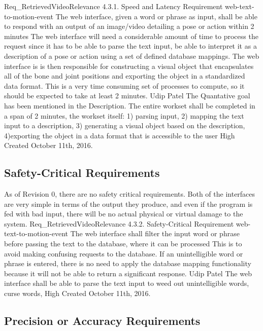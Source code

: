 \documentclass{scrreprt}
\begin{document}
\requirement
{Req_RetrievedVideoRelevance}
{4.3.1. Speed and Latency Requirement}
{web-text-to-motion-event}
{The web interface, given a word or phrase as input, shall be able to respond with an output of an image/video detailing a pose or action within 2 minutes}
{The web interface will need a considerable amount of time to process the request since it has to be able to parse the text input, be able to interpret it as a description of a pose or action using a set of defined database mappings. The web interface is is then responsible for constructing a visual object that encapsulates all of the bone and joint positions and exporting the object in a standardized data format. This is a very time consuming set of processes to compute, so it should be expected to take at least 2 minutes.}
{Udip Patel}
{The Quantative goal has been mentioned in the Description. The entire workset shall be completed in a span of 2 minutes, the workset itself: 1) parsing input, 2) mapping the text input to a description, 3) generating a visual object based on the description, 4)exporting the object in a data format that is accessible to the user }
{High}
{Created October 11th, 2016.}

\subsection{Safety-Critical Requirements}

As of Revision 0, there are no safety critical requirements. Both of the interfaces are very simple in terms of the output they produce, and even if the program is fed with bad input, there will be no actual physical or virtual damage to the system.
\requirement
{Req_RetrievedVideoRelevance}
{4.3.2. Safety-Critical Requirement}
{web-text-to-motion-event}
{The web interface shall filter the input word or phrase before passing the text to the database, where it can be processed}
{This is to avoid making confusing requests to the database. If an unintelligible word or phrase is entered, there is no need to apply the database mapping functionality because it will not be able to return a significant response.}
{Udip Patel}
{The web interface shall be able to parse the text input to weed out unintelligible words, curse words, }
{High}
{Created October 11th, 2016.}

\subsection{Precision or Accuracy Requirements}
\end{document}
